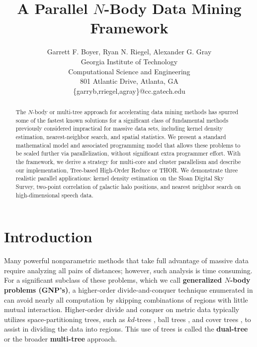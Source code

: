 \documentclass[twoside,leqno,twocolumn]{article}
\newcommand{\defterm}[1]{{\bf #1}}
\begin{document}
\title{A Parallel $N$-Body Data Mining Framework}

\author{Garrett F. Boyer, Ryan N. Riegel, Alexander G. Gray
\\ Georgia Institute of Technology
\\ Computational Science and Engineering
\\ 801 Atlantic Drive, Atlanta, GA
\\ \{garryb,rriegel,agray\}@cc.gatech.edu
\\
}

\maketitle
\thispagestyle{empty}

\begin{abstract}
The $N$-body or multi-tree approach for accelerating data mining methods has spurred some of the fastest known solutions for a significant class of fundamental methods previously considered impractical for massive data sets, including kernel density estimation, nearest-neighbor search, and spatial statistics.
We present a standard mathematical model and associated programming model that allows these problems to be scaled further via parallelization, without significant extra programmer effort.
With the framework, we derive a strategy for multi-core and cluster parallelism and describe our implementation, Tree-based High-Order Reduce or THOR.
We demonstrate three realistic parallel applications: kernel density estimation on the Sloan Digital Sky Survey, two-point correlation of galactic halo positions, and nearest neighbor search on high-dimensional speech data.
\end{abstract}

\section{Introduction}

Many powerful nonparametric methods that take full advantage of massive data require analyzing all pairs of distances; however, such analysis is time consuming.
For a significant subclass of these problems, which we call \defterm{generalized $N$-body problems (GNP's)}, a higher-order divide-and-conquer technique enumerated in \cite{gray_nbody} can avoid nearly all computation by skipping combinations of regions with little mutual interaction.
Higher-order divide and conquer on metric data typically utilizes space-partitioning trees, such as $kd$-trees \cite{preparata_kdtrees}, ball trees \cite{anchors_balltrees_moore}, and cover trees \cite{covertrees}, to assist in dividing the data into regions.
This use of trees is called the \defterm{dual-tree} or the broader \defterm{multi-tree} approach.
\end{document}
